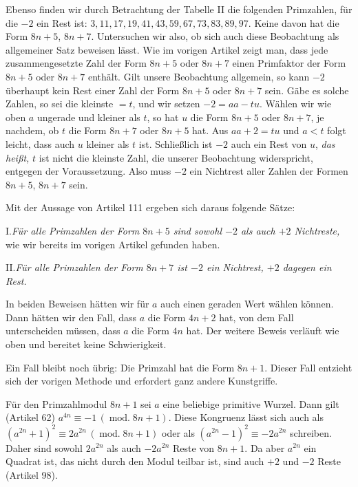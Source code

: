 Ebenso finden wir durch Betrachtung der Tabelle II die folgenden Primzahlen, für die $-2$ ein Rest ist: $3,11,17,19,41,43,59,67,73,83,89,97$. Keine davon hat die Form $8n+5$, $8n+7$. Untersuchen wir also, ob sich auch diese Beobachtung als allgemeiner Satz beweisen lässt. Wie im vorigen Artikel zeigt man, dass jede zusammengesetzte Zahl der Form $8n+5$ oder $8n+7$ einen Primfaktor der Form $8n+5$ oder $8n+7$ enthält. Gilt unsere Beobachtung allgemein, so kann $-2$ überhaupt kein Rest einer Zahl der Form $8n+5$ oder $8n+7$ sein. Gäbe es solche Zahlen, so sei die kleinste $=t$, und wir setzen $-2=aa-tu$. Wählen wir wie oben $a$ ungerade und kleiner als $t$, so hat $u$ die Form $8n+5$ oder $8n+7$, je nachdem, ob $t$ die Form $8n+7$ oder $8n+5$ hat. Aus $aa+2=tu$ und $a<t$ folgt leicht, dass auch $u$ kleiner als $t$ ist. Schließlich ist $-2$ auch ein Rest von $u$, \emph{das heißt,} $t$ ist nicht die kleinste Zahl, die unserer Beobachtung widerspricht, entgegen der Voraussetzung. Also muss $-2$ ein Nichtrest aller Zahlen der Formen $8n+5$, $8n+7$ sein.

Mit der Aussage von Artikel 111 ergeben sich daraus folgende Sätze:

I.\quad \emph{Für alle Primzahlen der Form $8n+5$ sind sowohl $-2$ als auch $+2$ Nichtreste,} wie wir bereits im vorigen Artikel gefunden haben.

II.\quad \emph{Für alle Primzahlen der Form $8n+7$ ist $-2$ ein Nichtrest, $+2$ dagegen ein Rest.}

In beiden Beweisen hätten wir für $a$ auch einen geraden Wert wählen können. Dann hätten wir den Fall, dass $a$ die Form $4n+2$ hat, von dem Fall unterscheiden müssen, dass $a$ die Form $4n$ hat. Der weitere Beweis verläuft wie oben und bereitet keine Schwierigkeit.

Ein Fall bleibt noch übrig: Die Primzahl hat die Form $8n+1$. Dieser Fall entzieht sich der vorigen Methode und erfordert ganz andere Kunstgriffe.

Für den Primzahlmodul $8n+1$ sei $a$ eine beliebige primitive Wurzel. Dann gilt (Artikel 62) $a^{4n}\equiv-1\,(\operatorname{mod.}8n+1)$. Diese Kongruenz lässt sich auch als $(a^{2n}+1)^2\equiv2a^{2n}\,(\operatorname{mod.}8n+1)$ oder als $(a^{2n}-1)^2\equiv-2a^{2n}$ schreiben. Daher sind sowohl $2a^{2n}$ als auch $-2a^{2n}$ Reste von $8n+1$. Da aber $a^{2n}$ ein Quadrat ist, das nicht durch den Modul teilbar ist, sind auch $+2$ und $-2$ Reste (Artikel 98).

